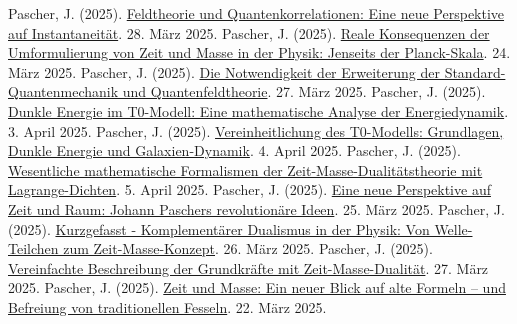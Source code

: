 \documentclass[12pt,a4paper]{article}
\begin{document}
\begin{thebibliography}{99}
		 Pascher, J. (2025). \href{https://github.com/jpascher/T0-Time-Mass-Duality/tree/main/2/pdf/Deutsch/FeldtheorieQuanten.pdf}{Feldtheorie und Quantenkorrelationen: Eine neue Perspektive auf Instantaneität}. 28. März 2025.
		 Pascher, J. (2025). \href{https://github.com/jpascher/T0-Time-Mass-Duality/tree/main/2/pdf/Deutsch/JenseitsPlanck.pdf}{Reale Konsequenzen der Umformulierung von Zeit und Masse in der Physik: Jenseits der Planck-Skala}. 24. März 2025.
		 Pascher, J. (2025). \href{https://github.com/jpascher/T0-Time-Mass-Duality/tree/main/2/pdf/Deutsch/NotwendigkeitQMErweiterung.pdf}{Die Notwendigkeit der Erweiterung der Standard-Quantenmechanik und Quantenfeldtheorie}. 27. März 2025.
		 Pascher, J. (2025). \href{https://github.com/jpascher/T0-Time-Mass-Duality/tree/main/2/pdf/Deutsch/MathEnergiedynamik.pdf}{Dunkle Energie im T0-Modell: Eine mathematische Analyse der Energiedynamik}. 3. April 2025.
		 Pascher, J. (2025). \href{https://github.com/jpascher/T0-Time-Mass-Duality/tree/main/2/pdf/Deutsch/T0VereinheitlichungDEGal.pdf}{Vereinheitlichung des T0-Modells: Grundlagen, Dunkle Energie und Galaxien-Dynamik}. 4. April 2025.
		 Pascher, J. (2025). \href{https://github.com/jpascher/T0-Time-Mass-Duality/tree/main/2/pdf/Deutsch/MathZeitMasseLagrange.pdf}{Wesentliche mathematische Formalismen der Zeit-Masse-Dualitätstheorie mit Lagrange-Dichten}. 5. April 2025.
		 Pascher, J. (2025). \href{https://github.com/jpascher/T0-Time-Mass-Duality/tree/main/2/pdf/Deutsch/ZeitRaumPascher.pdf}{Eine neue Perspektive auf Zeit und Raum: Johann Paschers revolutionäre Ideen}. 25. März 2025.
		 Pascher, J. (2025). \href{https://github.com/jpascher/T0-Time-Mass-Duality/tree/main/2/pdf/Deutsch/KomplementPhysikZeit.pdf}{Kurzgefasst - Komplementärer Dualismus in der Physik: Von Welle-Teilchen zum Zeit-Masse-Konzept}. 26. März 2025.
		 Pascher, J. (2025). \href{https://github.com/jpascher/T0-Time-Mass-Duality/tree/main/2/pdf/Deutsch/VierKraefteZeitMasse.pdf}{Vereinfachte Beschreibung der Grundkräfte mit Zeit-Masse-Dualität}. 27. März 2025.
		 Pascher, J. (2025). \href{https://github.com/jpascher/T0-Time-Mass-Duality/tree/main/2/pdf/Deutsch/ZeitMasseNeuerBlick.pdf}{Zeit und Masse: Ein neuer Blick auf alte Formeln – und Befreiung von traditionellen Fesseln}. 22. März 2025.

\end{thebibliography}
\end{document}
